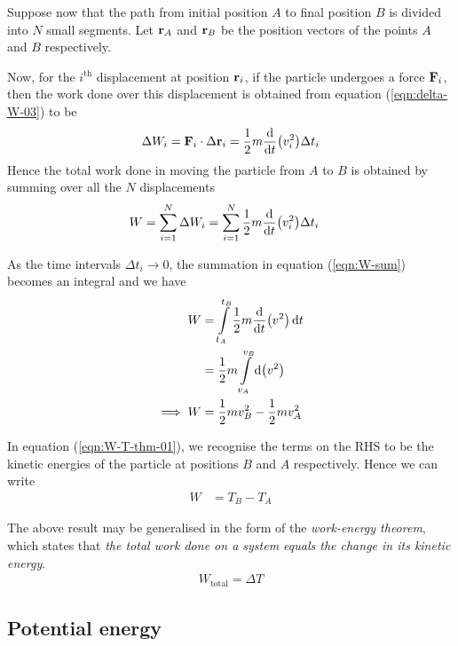 		Suppose now that the path from initial position $A$ to final position $B$ is divided into $N$ small segments. Let $\vb{r}_A$ and $\vb{r}_B$ be the position vectors of the points $A$ and $B$ respectively.
		
		Now, for the $i^\text{th}$ displacement at position $\vb{r}_i$, if the particle undergoes a force $\vb{F}_i$, then the work done over this displacement is obtained from equation (\ref{eqn:delta-W-03}) to be
		\begin{align*}
			\Delta W_i=\vb{F}_i\cdot\Delta\vb{r}_i=\dfrac{1}{2}m\dv{t}\qty(v_i^2)\Delta t_i
		\end{align*}
		Hence the total work done in moving the particle from $A$ to $B$ is obtained by summing over all the $N$ displacements
		\begin{align}
			W&=\sum_{i=1}^{N}{\Delta W_i}=\sum_{i=1}^{N}{\dfrac{1}{2}m\dv{t}\qty(v_i^2)\Delta t_i} \label{eqn:W-sum}
		\end{align}
		
		As the time intervals $\Delta t_i\to 0$, the summation in equation (\ref{eqn:W-sum}) becomes an integral and we have
		\begin{align}
			W&=\int\limits_{t_A}^{t_B}{\dfrac{1}{2}m\dv{t}\qty(v^2)\dd{t}} \nonumber\\
				&=\dfrac{1}{2}m\int\limits_{v_A}^{v_B}{\dd{\qty(v^2)}} \nonumber \\
			\implies W&=\dfrac{1}{2}mv_B^2-\dfrac{1}{2}mv_A^2 \label{eqn:W-T-thm-01}
		\end{align}
		
		In equation (\ref{eqn:W-T-thm-01}), we recognise the terms on the RHS to be the kinetic energies of the particle at positions $B$ and $A$ respectively. Hence we can write
		\begin{align*}
			W&=T_B-T_A
		\end{align*}
		
		The above result may be generalised in the form of the \emph{work-energy theorem}, which states that \emph{the total work done on a system equals the change in its kinetic energy}.
		\begin{align*}
			\boxed{W_\text{total}=\Delta T}
		\end{align*}
	
	\subsection{Potential energy}